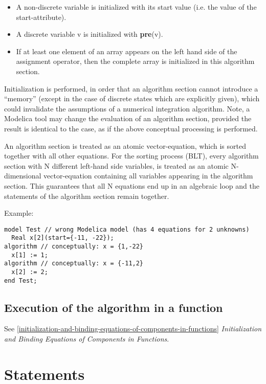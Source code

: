 \begin{itemize}
\item
  A non-discrete variable is initialized with its start value (i.e. the
  value of the start-attribute).
\item
  A discrete variable v is initialized with \textbf{pre}(v).
\item
  If at least one element of an array appears on the left hand side of
  the assignment operator, then the complete array is initialized in
  this algorithm section.
\end{itemize}

\begin{nonnormative}
Initialization is performed, in order that an algorithm section
cannot introduce a ``memory'' (except in the case of discrete states which
are explicitly given), which could invalidate the assumptions of a
numerical integration algorithm. Note, a Modelica tool may change the
evaluation of an algorithm section, provided the result is identical to
the case, as if the above conceptual processing is performed.

An algorithm section is treated as an atomic vector-equation,
which is sorted together with all other equations. For the sorting
process (BLT), every algorithm section with N different left-hand side
variables, is treated as an atomic N-dimensional vector-equation
containing all variables appearing in the algorithm section. This
guarantees that all N equations end up in an algebraic loop and the
statements of the algorithm section remain together.

Example:
\begin{lstlisting}[language=modelica]
model Test // wrong Modelica model (has 4 equations for 2 unknowns)
  Real x[2](start={-11, -22});
algorithm // conceptually: x = {1,-22}
  x[1] := 1;
algorithm // conceptually: x = {-11,2}
  x[2] := 2;
end Test;
\end{lstlisting}
\end{nonnormative}

\subsection{Execution of the algorithm in a function}

See \autoref{initialization-and-binding-equations-of-components-in-functions} \emph{Initialization and Binding Equations of
Components in Functions}.

\section{Statements}


